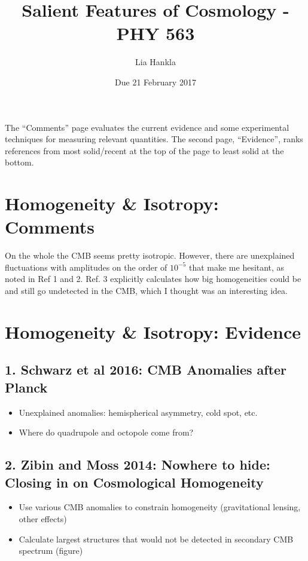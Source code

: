 \documentclass{article}
\title{Salient Features of Cosmology - PHY 563}
\author{Lia Hankla}
\date{Due 21 February 2017}
\begin{document}
\maketitle
The ``Comments'' page evaluates the current evidence and some experimental techniques for measuring relevant quantities. The second page, ``Evidence'', ranks references from most solid/recent at the top of the page to least solid at the bottom.

\newpage
\section{Homogeneity \& Isotropy: Comments}
On the whole the CMB seems pretty isotropic. However, there are unexplained fluctuations with amplitudes on the order of $10^{-5}$ that make me hesitant, as noted in Ref 1 and 2. Ref. 3 explicitly calculates how big homogeneities could be and still go undetected in the CMB, which I thought was an interesting idea. 

\newpage
\section*{Homogeneity \& Isotropy: Evidence}

\subsection*{1. Schwarz et al 2016: CMB Anomalies after Planck}
\begin{itemize}
\item Unexplained anomalies: hemispherical asymmetry, cold spot, etc.
\item Where do quadrupole and octopole come from?
\end{itemize}

\subsection*{2. Zibin and Moss 2014: Nowhere to hide: Closing in on Cosmological Homogeneity}
\begin{itemize}
\item Use various CMB anomalies to constrain homogeneity (gravitational lensing, other effects)
\item Calculate largest structures that would not be detected in secondary CMB spectrum (figure)
\end{itemize}
\end{document}
